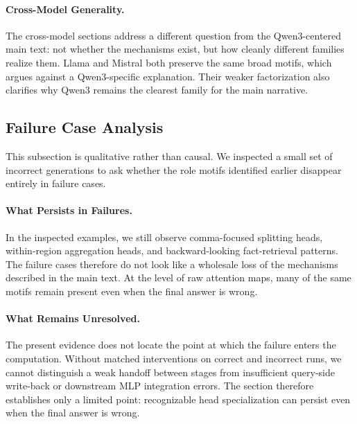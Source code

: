 \documentclass[11pt]{article}
\begin{document}
\paragraph{Cross-Model Generality.}
The cross-model sections address a different question from the Qwen3-centered main text: not whether the mechanisms exist, but how cleanly different families realize them. Llama and Mistral both preserve the same broad motifs, which argues against a Qwen3-specific explanation. Their weaker factorization also clarifies why Qwen3 remains the clearest family for the main narrative.

\subsection{Failure Case Analysis}
\label{sec:failure_analysis}

This subsection is qualitative rather than causal. We inspected a small set of incorrect generations to ask whether the role motifs identified earlier disappear entirely in failure cases.


\paragraph{What Persists in Failures.}
In the inspected examples, we still observe comma-focused splitting heads, within-region aggregation heads, and backward-looking fact-retrieval patterns. The failure cases therefore do not look like a wholesale loss of the mechanisms described in the main text. At the level of raw attention maps, many of the same motifs remain present even when the final answer is wrong.

\paragraph{What Remains Unresolved.}
The present evidence does not locate the point at which the failure enters the computation. Without matched interventions on correct and incorrect runs, we cannot distinguish a weak handoff between stages from insufficient query-side write-back or downstream MLP integration errors. The section therefore establishes only a limited point: recognizable head specialization can persist even when the final answer is wrong.
\end{document}
